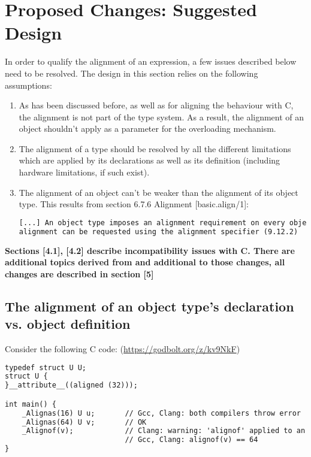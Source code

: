 \documentclass[11pt]{article}
\begin{document}
\section{Proposed Changes: Suggested Design }

In order to qualify the alignment of an expression, a few issues described below need to be resolved. The design in this section relies on the following assumptions:

 \begin{enumerate}
 
    \item As has been discussed before, as well as for aligning the behaviour with C, the alignment is not part of the type system. As a result, the alignment of an object shouldn't apply as a parameter for the overloading mechanism.

    \item The alignment of a type should be resolved by all the different limitations which are applied by its declarations as well as its definition (including hardware limitations, if such exist).

    \item The alignment of an object can't be weaker than the alignment of its object type. This results from section 6.7.6 Alignment [basic.align/1]:
    \begin{lstlisting}[language=diff]
[...] An object type imposes an alignment requirement on every object of that type; stricter
alignment can be requested using the alignment specifier (9.12.2)
    \end{lstlisting}

\end{enumerate}


\textbf{Sections [4.1], [4.2] describe incompatibility issues with C. There are additional topics derived from and additional to those changes, all  changes are described in section [5]} 

\subsection{The alignment of an object type's declaration vs. object definition}

Consider the following C code: (\url{https://godbolt.org/z/kv9NkF})

\begin{lstlisting}[language=diff]
typedef struct U U;
struct U {
}__attribute__((aligned (32))); 

int main() {
    _Alignas(16) U u;       // Gcc, Clang: both compilers throw error 
    _Alignas(64) U v;       // OK
    _Alignof(v);            // Clang: warning: 'alignof' applied to an expression is a GNU extension.
                            // Gcc, Clang: alignof(v) == 64
}  
\end{lstlisting}
\end{document}
